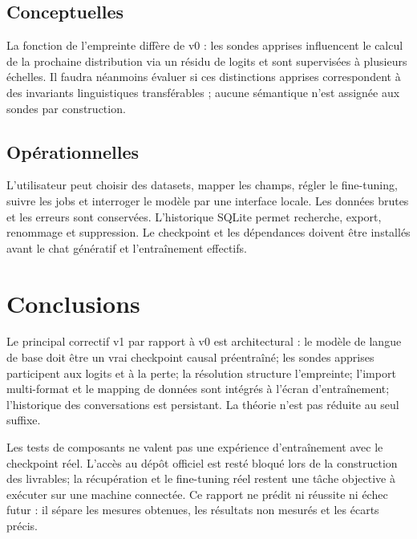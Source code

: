 \documentclass[11pt,a4paper]{article}
\begin{document}
\subsection{Conceptuelles}
La fonction de l'empreinte diffère de v0 : les sondes apprises influencent le calcul de la prochaine distribution via un résidu de logits et sont supervisées à plusieurs échelles. Il faudra néanmoins évaluer si ces distinctions apprises correspondent à des invariants linguistiques transférables ; aucune sémantique n'est assignée aux sondes par construction.
\subsection{Opérationnelles}
L'utilisateur peut choisir des datasets, mapper les champs, régler le fine-tuning, suivre les jobs et interroger le modèle par une interface locale. Les données brutes et les erreurs sont conservées. L'historique SQLite permet recherche, export, renommage et suppression. Le checkpoint et les dépendances doivent être installés avant le chat génératif et l'entraînement effectifs.

\section{Conclusions}
Le principal correctif v1 par rapport à v0 est architectural : le modèle de langue de base doit être un vrai checkpoint causal préentraîné; les sondes apprises participent aux logits et à la perte; la résolution structure l'empreinte; l'import multi-format et le mapping de données sont intégrés à l'écran d'entraînement; l'historique des conversations est persistant. La théorie n'est pas réduite au seul suffixe.

Les tests de composants ne valent pas une expérience d'entraînement avec le checkpoint réel. L'accès au dépôt officiel est resté bloqué lors de la construction des livrables; la récupération et le fine-tuning réel restent une tâche objective à exécuter sur une machine connectée. Ce rapport ne prédit ni réussite ni échec futur : il sépare les mesures obtenues, les résultats non mesurés et les écarts précis.
\end{document}
